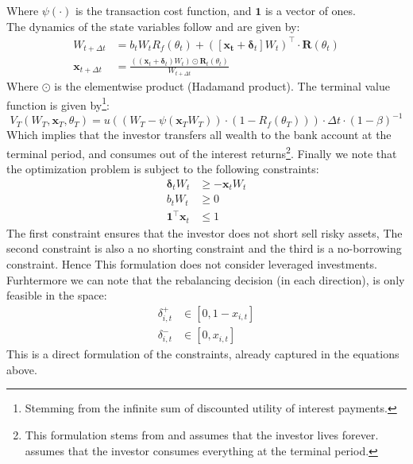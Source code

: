 \documentclass[11pt]{article}
\begin{document}
Where $\psi(\cdot )$ is the transaction cost function, and $\mathbf{1}$ is a vector of ones.\\
The dynamics of the state variables follow \textcite{Schober2022} and are given by:
\begin{align}
  W_{t+\Delta t} &= b_t W_t R_f (\theta_t) +  ( [ \mathbf{x_t} + \boldsymbol{\delta}_t ] W_t )^{\top} \cdot \mathbf{R}(\theta_t) \\
  \mathbf{x}_{t+\Delta t} &=  \frac{( (\mathbf{x}_t + \boldsymbol{\delta}_t ) W_t ) \odot \mathbf{R}_t (\theta_t )}{ W_{t+\Delta t} }
\end{align}
Where $\odot$ is the elementwise product (Hadamand product). The terminal value function is
given by\footnote{Stemming from the infinite sum of discounted utility of interest payments.}:
\begin{equation} \label{eq: class_terminal_value_non_normalized}
  V_T (W_T , \mathbf{x}_T , \theta_T ) = u ( ( W_T - \psi ( \mathbf{x}_T W_T )) \cdot (1-R_f (\theta_T)) )\cdot \Delta t \cdot (1-\beta)^{-1}
\end{equation}
Which implies that the investor transfers all wealth to the bank account at the terminal period,
and consumes out of the interest
returns\footnote{This formulation stems from \textcite{CaiJuddXu2013} and assumes that the investor lives forever.
\textcite{Scheidegger2023} assumes that the investor consumes everything at the terminal period.}.
Finally we note that the optimization problem is subject to the following constraints:
\begin{align}
  \boldsymbol{\delta}_t W_t &\geq - \mathbf{x}_t W_t \\
  b_t W_t &\geq 0 \\
  \mathbf{1}^{\top} \mathbf{x}_t &\leq 1
\end{align}
The first constraint ensures that the investor does not short sell risky assets, 
The second constraint is also a no shorting constraint
and the third is a no-borrowing constraint. Hence This formulation does not consider leveraged investments.\\
Furhtermore we can note that the rebalancing decision (in each direction), is only feasible in the space:
\begin{align}
  \delta^{+}_{i,t} &\in [0 , 1-x_{i,t}]  \label{eq: delta+_space} \\
  \delta^{-}_{i,t} &\in [0 , x_{i,t}] \label{eq: delta-_space}
\end{align}
This is a direct formulation of the constraints, already captured in the equations above.\\
\end{document}
